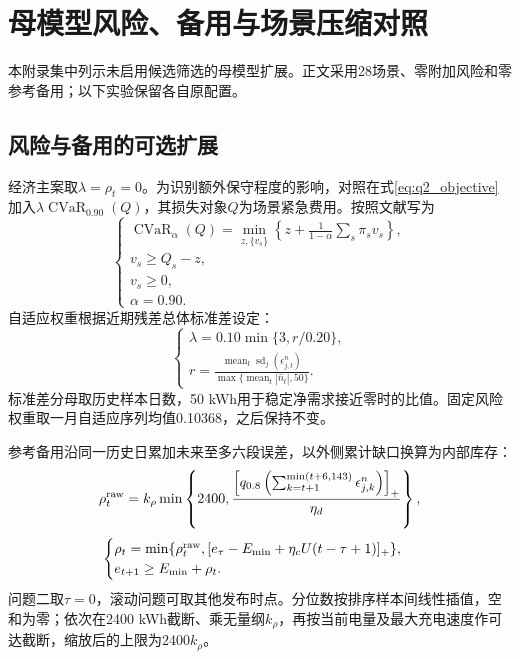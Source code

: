 \section{母模型风险、备用与场景压缩对照}
\label{app:optional_models}

本附录集中列示未启用候选筛选的母模型扩展。正文采用28场景、零附加风险和零参考备用；以下实验保留各自原配置。

\subsection{风险与备用的可选扩展}

经济主案取$\lambda=\rho_t=0$。为识别额外保守程度的影响，对照在式\eqref{eq:q2_objective}加入$\lambda\operatorname{CVaR}_{0.90}(Q)$，其损失对象$Q$为场景紧急费用。按照文献\cite{rockafellar2000}写为
\begin{equation}
 \begin{cases}
 \displaystyle
 \operatorname{CVaR}_{\alpha}(Q)=
 \min_{z,\{v_s\}}\left\{z+\frac{1}{1-\alpha}\sum_s\pi_sv_s\right\},\\
 v_s\ge Q_s-z,\\
 v_s\ge0,\\
 \alpha=0.90.
 \end{cases}
 \label{eq:cvar}
\end{equation}
自适应权重根据近期残差总体标准差设定：
\begin{equation}
 \begin{cases}
 \lambda=0.10\min\{3,r/0.20\},\\
 \displaystyle r=\frac{\operatorname{mean}_t\operatorname{sd}_j(\epsilon^n_{j,t})}
 {\max\{\operatorname{mean}_t|\widehat n_t|,50\}}.
 \end{cases}
 \label{eq:risk_weight}
\end{equation}
标准差分母取历史样本日数，50 kWh用于稳定净需求接近零时的比值。固定风险权重取一月自适应序列均值0.10368，之后保持不变。

参考备用沿同一历史日累加未来至多六段误差，以外侧累计缺口换算为内部库存：
\begin{equation}
 \rho_t^{\rm raw}
 =k_\rho\min\left\{2400,
 \frac{\left[q_{0.8}\left(\sum_{k=t+1}^{\min(t+6,143)}
             \epsilon^n_{j,k}\right)\right]_+}{\eta_d}\right\},
 \label{eq:reserve}
\end{equation}
\begin{equation}
 \begin{cases}
 \rho_t=\min\{\rho_t^{\rm raw},
 [e_\tau-E_{\min}+\eta_cU(t-\tau+1)]_+\},\\
 e_{t+1}\ge E_{\min}+\rho_t.
 \end{cases}
 \label{eq:reachable_reserve}
\end{equation}
问题二取$\tau=0$，滚动问题可取其他发布时点。分位数按排序样本间线性插值，空和为零；依次在2400 kWh截断、乘无量纲$k_\rho$，再按当前电量及最大充电速度作可达截断，缩放后的上限为$2400k_\rho$。

